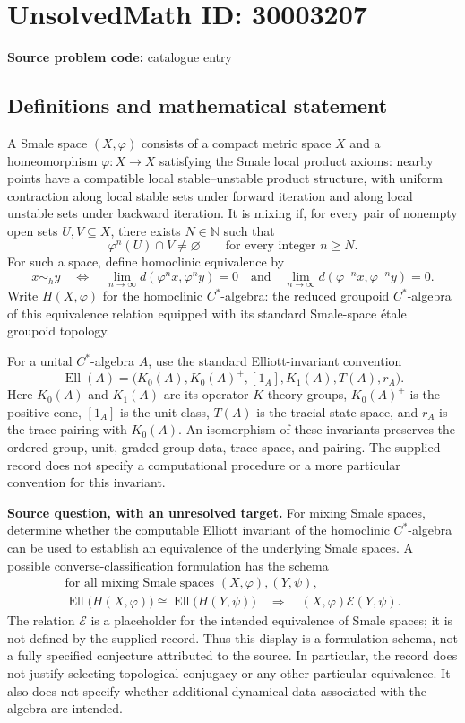 \documentclass[11pt]{article}
\newcommand{\N}{\mathbb{N}}
\begin{document}
\section*{UnsolvedMath ID: 30003207}
\textbf{Source problem code:} catalogue entry
\subsection{Definitions and mathematical statement}
A Smale space \((X,\varphi)\) consists of a compact metric space \(X\) and a homeomorphism \(\varphi\colon X\to X\) satisfying the Smale local product axioms: nearby points have a compatible local stable--unstable product structure, with uniform contraction along local stable sets under forward iteration and along local unstable sets under backward iteration. It is mixing if, for every pair of nonempty open sets \(U,V\subseteq X\), there exists \(N\in\N\) such that
\[
\varphi^n(U)\cap V\ne\varnothing\qquad\text{for every integer }n\ge N.
\]
For such a space, define homoclinic equivalence by
\[
x\sim_h y\quad\Longleftrightarrow\quad
\lim_{n\to\infty}d(\varphi^n x,\varphi^n y)=0
\quad\text{and}\quad
\lim_{n\to\infty}d(\varphi^{-n}x,\varphi^{-n}y)=0.
\]
Write \(H(X,\varphi)\) for the homoclinic \(C^*\)-algebra: the reduced groupoid \(C^*\)-algebra of this equivalence relation equipped with its standard Smale-space étale groupoid topology.

For a unital \(C^*\)-algebra \(A\), use the standard Elliott-invariant convention
\[
\operatorname{Ell}(A)=
\bigl(K_0(A),K_0(A)^+,[1_A],K_1(A),T(A),r_A\bigr).
\]
Here \(K_0(A)\) and \(K_1(A)\) are its operator \(K\)-theory groups, \(K_0(A)^+\) is the positive cone, \([1_A]\) is the unit class, \(T(A)\) is the tracial state space, and \(r_A\) is the trace pairing with \(K_0(A)\). An isomorphism of these invariants preserves the ordered group, unit, graded group data, trace space, and pairing. The supplied record does not specify a computational procedure or a more particular convention for this invariant.

\textbf{Source question, with an unresolved target.} For mixing Smale spaces, determine whether the computable Elliott invariant of the homoclinic \(C^*\)-algebra can be used to establish an equivalence of the underlying Smale spaces. A possible converse-classification formulation has the schema
\[
\begin{gathered}
\text{for all mixing Smale spaces }(X,\varphi),(Y,\psi),\\
\operatorname{Ell}\bigl(H(X,\varphi)\bigr)
\cong
\operatorname{Ell}\bigl(H(Y,\psi)\bigr)
\quad\Longrightarrow\quad
(X,\varphi)\mathrel{\mathcal E}(Y,\psi).
\end{gathered}
\]
The relation \(\mathcal E\) is a placeholder for the intended equivalence of Smale spaces; it is not defined by the supplied record. Thus this display is a formulation schema, not a fully specified conjecture attributed to the source. In particular, the record does not justify selecting topological conjugacy or any other particular equivalence. It also does not specify whether additional dynamical data associated with the algebra are intended.
\end{document}
